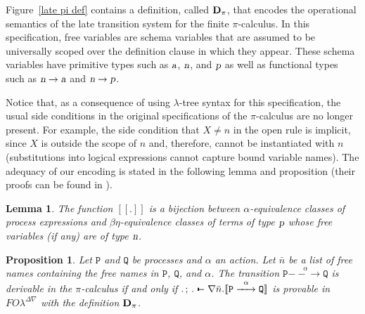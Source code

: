 \documentclass{acmtrans2m}
\newtheorem{lemma}[theorem]{Lemma}
\newtheorem{proposition}[theorem]{Proposition}
\def\Ppi{{\mathtt P}}
\def\Qpi{{\mathtt Q}}
\def\relbar{\mathrel{\smash-}}
\def\joinrelm{\mathrel{\mkern-3.2mu}}
\def\tailpiece{\kern 1pt\vrule height 1ex width 0.3ex depth -.25ex}
\def\seqsym{\mathrel{\tailpiece\joinrelm\relbar}}
\newcommand{\FOL   }{FO\lambda}
\newcommand{\FOLDNb}{\FOL^{\Delta\nabla}}
\newcommand{\NSeq}[3]{#1\,;\,#2 \seqsym #3}
\newcommand{\action}{\hbox{\sl a}}
\newcommand{\name}{\hbox{\sl n}}
\newcommand{\one  }[3]{#1\stackrel{#2}{-\!\!-\!\!\!\rightarrow    } #3}
\newcommand{\proc}{\hbox{\sl p}}
\newcommand{\ra}{\rightarrow}
\newcommand{\trans}[1]{[\![ #1 ]\!]}
\begin{document}
Figure~\ref{late pi def} contains a definition, called ${\bf D}_\pi$,
that encodes the operational semantics of the late transition system
for the finite $\pi$-calculus.
In this specification, free variables are schema
variables that are assumed to be universally scoped over the 
definition clause in which they appear.  These schema
variables have primitive types such as $\action$, $\name$, and $\proc$
as well as functional types such as $\name\ra\action$ and
$\name\ra\proc$.  

Notice that, as a consequence of using $\lambda$-tree syntax for this
specification, the usual side conditions in the original specifications of
the $\pi$-calculus \cite{milner92icII} are no longer present. 
For example, the side condition that $X \not = n$ in
the open rule is implicit, since $X$ is outside the scope of $n$ and, therefore,
cannot be instantiated with $n$ (substitutions into logical
expressions cannot capture bound variable names).
The adequacy of our encoding is stated in the following lemma and 
proposition (their proofs can be found in \cite{tiu04phd}).

\begin{lemma}
\label{lemma: adequacy}
The function $\trans{.}$ is a bijection between $\alpha$-equivalence
classes of process expressions and $\beta\eta$-equivalence classes of
terms of type $\proc$ whose free variables (if any) are of type $\name$.
\end{lemma}

\begin{proposition}
\label{prop:one step}
Let $\Ppi$ and $\Qpi$ be processes and $\alpha$ an action. Let $\bar{n}$ be
a list of free names containing the free names in $\Ppi$, $\Qpi$, and $\alpha$.
The transition $\one{\Ppi}{\alpha}{\Qpi}$ is derivable in the $\pi$-calculus if and only
if $\NSeq{.}{.}{\nabla \bar{n}.\trans{\one{\Ppi}{\alpha}{\Qpi}}}$ is provable 
in $\FOLDNb$ with the definition ${\bf D}_\pi$.
\end{proposition}
\end{document}
